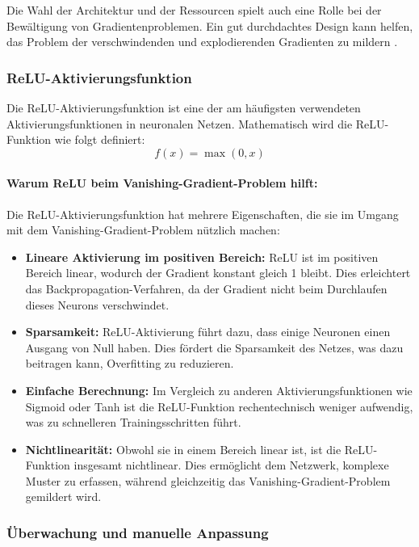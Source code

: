Die Wahl der Architektur und der Ressourcen spielt auch eine Rolle bei der Bewältigung von Gradientenproblemen. Ein gut durchdachtes Design kann helfen, das Problem der verschwindenden und explodierenden Gradienten zu mildern \cite{aggarwal_neural_networks_2018}.


\subsubsection{ReLU-Aktivierungsfunktion}

Die ReLU-Aktivierungsfunktion ist eine der am häufigsten verwendeten Aktivierungsfunktionen in neuronalen Netzen. Mathematisch wird die ReLU-Funktion wie folgt definiert:
\[
f(x) = \max(0, x)
\]


\paragraph{Warum ReLU beim Vanishing-Gradient-Problem hilft:}

Die ReLU-Aktivierungsfunktion hat mehrere Eigenschaften, die sie im Umgang mit dem Vanishing-Gradient-Problem nützlich machen:

\begin{itemize}
    \item \textbf{Lineare Aktivierung im positiven Bereich:} ReLU ist im positiven Bereich linear, wodurch der Gradient konstant gleich 1 bleibt. Dies erleichtert das Backpropagation-Verfahren, da der Gradient nicht beim Durchlaufen dieses Neurons verschwindet.
    
    \item \textbf{Sparsamkeit:} ReLU-Aktivierung führt dazu, dass einige Neuronen einen Ausgang von Null haben. Dies fördert die Sparsamkeit des Netzes, was dazu beitragen kann, Overfitting zu reduzieren.
    
    \item \textbf{Einfache Berechnung:} Im Vergleich zu anderen Aktivierungsfunktionen wie Sigmoid oder Tanh ist die ReLU-Funktion rechentechnisch weniger aufwendig, was zu schnelleren Trainingsschritten führt.
    
    \item \textbf{Nichtlinearität:} Obwohl sie in einem Bereich linear ist, ist die ReLU-Funktion insgesamt nichtlinear. Dies ermöglicht dem Netzwerk, komplexe Muster zu erfassen, während gleichzeitig das Vanishing-Gradient-Problem gemildert wird.
\end{itemize}


\subsubsection{Überwachung und manuelle Anpassung}

